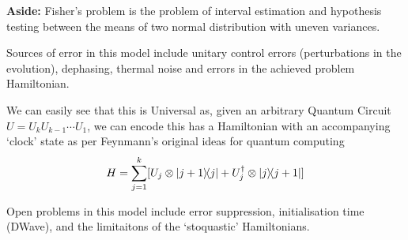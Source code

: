 \documentclass[11pt]{article}
\begin{document}
\hrulefill

\textbf{Aside:} Fisher's problem is the problem of interval estimation and hypothesis testing between the means of two normal distribution with uneven variances.

\hrulefill

Sources of error in this model include unitary control errors (perturbations in the evolution), dephasing, thermal noise and errors in the achieved problem Hamiltonian.

We can easily see that this is Universal as, given an arbitrary Quantum Circuit $U=U_{k}U_{k-1}\cdots U_{1}$, we can encode this has a Hamiltonian with an accompanying `clock' state as per Feynmann's original ideas for quantum computing
\begin{equation}
    H=\sum_{j=1}^{k}[U_{j}\otimes\ketbra{j+1}{j}+U_{j}^{\dagger}\otimes\ketbra{j}{j+1}]
\end{equation}

Open problems in this model include error suppression, initialisation time (DWave), and the limitaitons of the `stoquastic' Hamiltonians.
\end{document}
